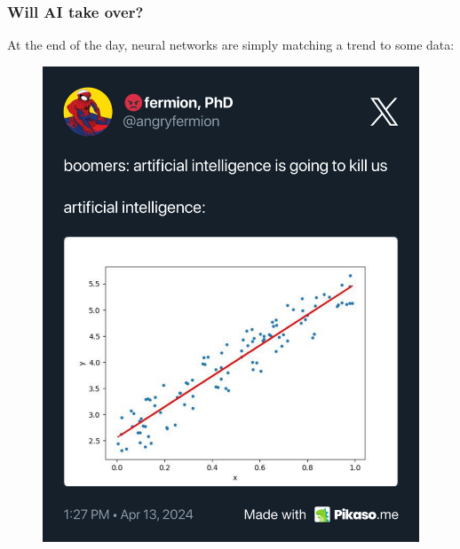 \documentclass{beamer}
\begin{document}
\begin{frame}
    \frametitle{Will AI take over?}
    At the end of the day, neural networks are simply matching a trend to some data:
    \begin{figure}
        \centering
        \includegraphics[height=0.75\textheight]{./images/pikaso.me-angryfermion-20240413_132756-1779139460174676132.png}
    \end{figure}
\end{frame}
\end{document}
